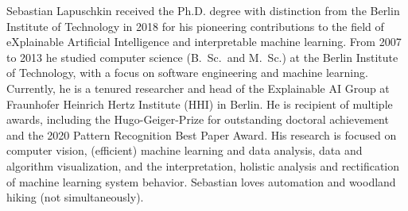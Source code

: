 \documentclass[10pt,a4paper]{article} %
\begin{document}
\spacedhrule{0.9em}{-0.4em} %



\vspace{-1.3em} %

\begin{multicols}{2}  %
\noindent

Sebastian Lapuschkin received the Ph.D. degree with distinction from the Berlin Institute of Technology in 2018
for his pioneering contributions to the field of eXplainable Artificial Intelligence and interpretable machine learning.
From 2007 to 2013 he studied computer science (B.\ Sc.\ and M.\ Sc.) at the Berlin Institute of Technology,
with a focus on software engineering and machine learning.
Currently, he is a tenured researcher and head of the Explainable AI Group at Fraunhofer Heinrich Hertz Institute (HHI) in Berlin.
He is recipient of multiple awards,
including the Hugo-Geiger-Prize for outstanding doctoral achievement and the 2020 Pattern Recognition Best Paper Award.
His research is focused on computer vision,
(efficient) machine learning and data analysis, data and algorithm visualization,
and the interpretation, holistic analysis and rectification of machine learning system behavior.
Sebastian loves automation and woodland hiking (not simultaneously).

\end{multicols}

\spacedhrule{0.5em}{-0.4em} %




\end{document}
